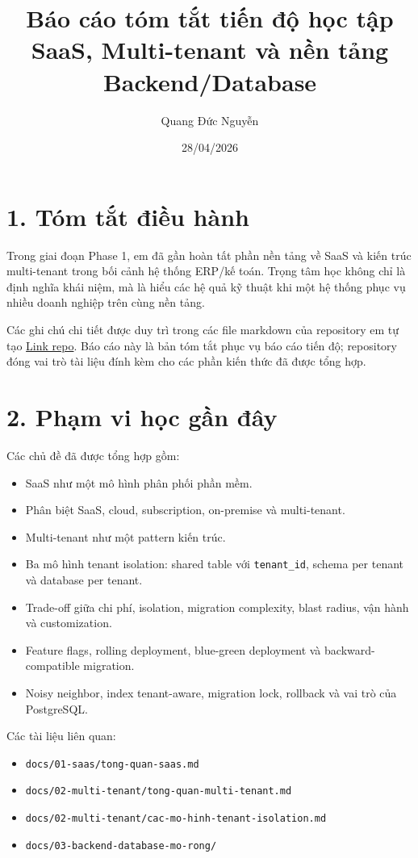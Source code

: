 \documentclass[12pt,a4paper]{article}
\title{\textbf{Báo cáo tóm tắt tiến độ học tập}\\SaaS, Multi-tenant và nền tảng Backend/Database}
\author{Quang Đức Nguyễn}
\date{28/04/2026}
\begin{document}
    \maketitle

    \section*{1. Tóm tắt điều hành}

    Trong giai đoạn Phase 1, em đã gần hoàn tất phần nền tảng về SaaS và kiến trúc multi-tenant trong bối cảnh hệ thống ERP/kế toán. Trọng tâm học không chỉ là định nghĩa khái niệm, mà là hiểu các hệ quả kỹ thuật khi một hệ thống phục vụ nhiều doanh nghiệp trên cùng nền tảng.

    Các ghi chú chi tiết được duy trì trong các file markdown của repository em tự tạo \href{https://github.com/quangducnguyen1205/erp-accounting-lab-phase1-viettel}{Link repo}. Báo cáo này là bản tóm tắt phục vụ báo cáo tiến độ; repository đóng vai trò tài liệu đính kèm cho các phần kiến thức đã được tổng hợp.

    \section*{2. Phạm vi học gần đây}

    Các chủ đề đã được tổng hợp gồm:

    \begin{itemize}[leftmargin=*]
    \item SaaS như một mô hình phân phối phần mềm.
    \item Phân biệt SaaS, cloud, subscription, on-premise và multi-tenant.
    \item Multi-tenant như một pattern kiến trúc.
    \item Ba mô hình tenant isolation: shared table với \texttt{tenant\_id}, schema per tenant và database per tenant.
    \item Trade-off giữa chi phí, isolation, migration complexity, blast radius, vận hành và customization.
    \item Feature flags, rolling deployment, blue-green deployment và backward-compatible migration.
    \item Noisy neighbor, index tenant-aware, migration lock, rollback và vai trò của PostgreSQL.
    \end{itemize}

    Các tài liệu liên quan:

    \begin{itemize}[leftmargin=*]
    \item \texttt{docs/01-saas/tong-quan-saas.md}
    \item \texttt{docs/02-multi-tenant/tong-quan-multi-tenant.md}
    \item \texttt{docs/02-multi-tenant/cac-mo-hinh-tenant-isolation.md}
    \item \texttt{docs/03-backend-database-mo-rong/}
    \end{itemize}
\end{document}
